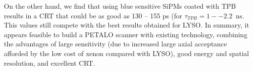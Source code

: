 \documentclass[review]{elsarticle}
\begin{document}
On the other hand, we find that using blue sensitive SiPMs coated with TPB results in a CRT that could be as good as
130 -- 155 ps (for $\tau_{TPB} = 1--2.2$~ns. This values still compete with the best results obtained for LYSO.  In summary, it appears feasible to build a PETALO scanner with existing technology, combining the advantages of large sensitivity (due to increased large axial acceptance afforded by the low cost of xenon compared with LYSO), good energy and spatial resolution, and excellent CRT.     

\section*{}


\end{document}
